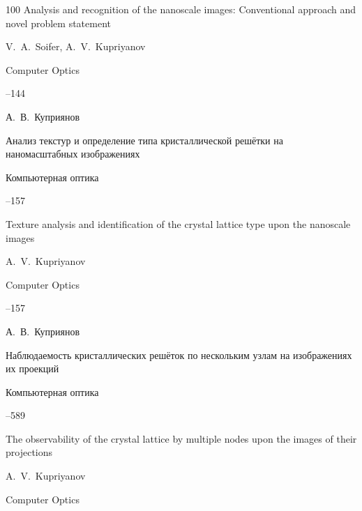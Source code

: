 \begin{thebibliography}{100}
\paper Analysis and recognition of the nanoscale images: Conventional approach and novel problem statement

\by V.~A.~Soifer, A.~V.~Kupriyanov 

\jour Computer Optics




--144




\by А.~В.~Куприянов

\paper Анализ текстур и определение типа кристаллической решётки на наномасштабных изображениях

\jour Компьютерная оптика




--157

\misctransl

\paper Texture analysis and identification of the crystal lattice type upon the nanoscale images

\by A.~V.~Kupriyanov 

\jour Computer Optics




--157






\by  А.~В.~Куприянов

\paper Наблюдаемость кристаллических решёток по нескольким узлам на изображениях их проекций

\jour  Компьютерная оптика




--589

\misctransl

\paper The observability of the crystal lattice by multiple nodes upon the images of their projections

\by A.~V.~Kupriyanov

\jour Computer Optics




\end{thebibliography}
